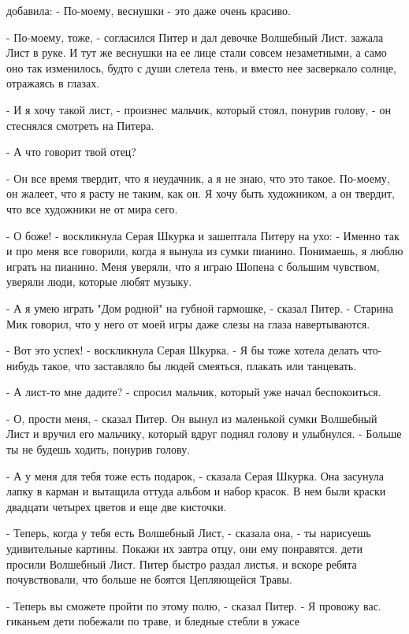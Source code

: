 добавила: - По-моему, веснушки - это даже очень красиво.
\par- По-моему, тоже, - согласился Питер и дал девочке Волшебный Лист.
 зажала Лист в руке. И тут же веснушки на ее лице стали совсем 
незаметными, а само оно так изменилось, будто с души слетела тень, и 
вместо нее засверкало солнце, отражаясь в глазах.
\par- И я хочу такой лист, - произнес мальчик, который стоял, понурив 
голову, - он стеснялся смотреть на Питера.
\par- А что говорит твой отец?
\par- Он все время твердит, что я неудачник, а я не знаю, что это 
такое. По-моему, он жалеет, что я расту не таким, как он. Я хочу быть 
художником, а он твердит, что все художники не от мира сего.
\par- О боже! - воскликнула Серая Шкурка и зашептала Питеру на ухо: - 
Именно так и про меня все говорили, когда я вынула из сумки пианино. 
Понимаешь, я люблю играть на пианино. Меня уверяли, что я играю Шопена 
с большим чувством, уверяли люди, которые любят музыку.
\par- А я умею играть "Дом родной" на губной гармошке, - сказал Питер. 
- Старина Мик говорил, что у него от моей игры даже слезы на глаза 
навертываются.
\par- Вот это успех! - воскликнула Серая Шкурка. - Я бы тоже хотела 
делать что-нибудь такое, что заставляло бы людей смеяться, плакать или 
танцевать.
\par- А лист-то мне дадите? - спросил мальчик, который уже начал 
беспокоиться.
\par- О, прости меня, - сказал Питер. Он вынул из маленькой сумки 
Волшебный Лист и вручил его мальчику, который вдруг поднял голову и 
улыбнулся. - Больше ты не будешь ходить, понурив голову.
\par- А у меня для тебя тоже есть подарок, - сказала Серая Шкурка. Она 
засунула лапку в карман и вытащила оттуда альбом и набор красок. В нем 
были краски двадцати четырех цветов и еще две кисточки.
\par- Теперь, когда у тебя есть Волшебный Лист, - сказала она, - ты 
нарисуешь удивительные картины. Покажи их завтра отцу, они ему 
понравятся.
 дети просили Волшебный Лист. Питер быстро раздал листья, и 
вскоре ребята почувствовали, что больше не боятся Цепляющейся Травы.
\par- Теперь вы сможете пройти по этому полю, - сказал Питер. - Я 
провожу вас.
 гиканьем дети побежали по траве, и бледные стебли в ужасе 
